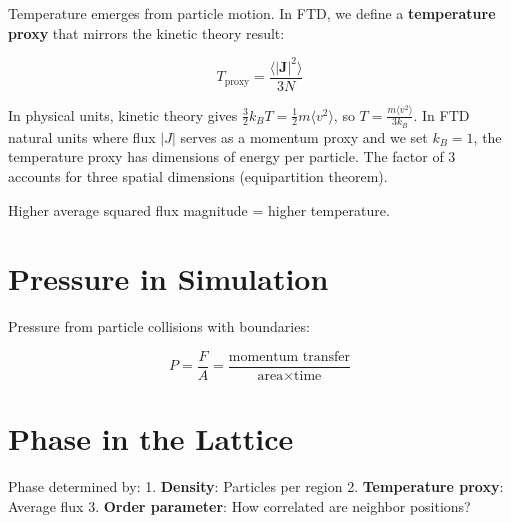 \documentclass[
  11pt,
  letterpaper,
  twoside,
  openright]{book}
\begin{document}
Temperature emerges from particle motion. In FTD, we define a
\textbf{temperature proxy} that mirrors the kinetic theory result:

\[
T_{\text{proxy}} = \frac{\langle|\mathbf{J}|^2\rangle}{3N}
\]

\begin{tcolorbox}[enhanced jigsaw, leftrule=.75mm, title=\textcolor{quarto-callout-note-color}{\faInfo}\hspace{0.5em}{Dimensional Analysis}, bottomrule=.15mm, opacityback=0, coltitle=black, arc=.35mm, colframe=quarto-callout-note-color-frame, colbacktitle=quarto-callout-note-color!10!white, colback=white, titlerule=0mm, breakable, bottomtitle=1mm, toptitle=1mm, rightrule=.15mm, toprule=.15mm, left=2mm, opacitybacktitle=0.6]

In physical units, kinetic theory gives
\(\frac{3}{2}k_B T = \frac{1}{2}m\langle v^2\rangle\), so
\(T = \frac{m\langle v^2\rangle}{3k_B}\). In FTD natural units where
flux \(|J|\) serves as a momentum proxy and we set \(k_B = 1\), the
temperature proxy has dimensions of energy per particle. The factor of 3
accounts for three spatial dimensions (equipartition theorem).

\end{tcolorbox}

Higher average squared flux magnitude = higher temperature.

\section{Pressure in Simulation}\label{pressure-in-simulation}

Pressure from particle collisions with boundaries:

\[
P = \frac{F}{A} = \frac{\text{momentum transfer}}{\text{area} \times \text{time}}
\]

\section{Phase in the Lattice}\label{phase-in-the-lattice}

Phase determined by: 1. \textbf{Density}: Particles per region 2.
\textbf{Temperature proxy}: Average \textbar flux\textbar{} 3.
\textbf{Order parameter}: How correlated are neighbor positions?
\end{document}
